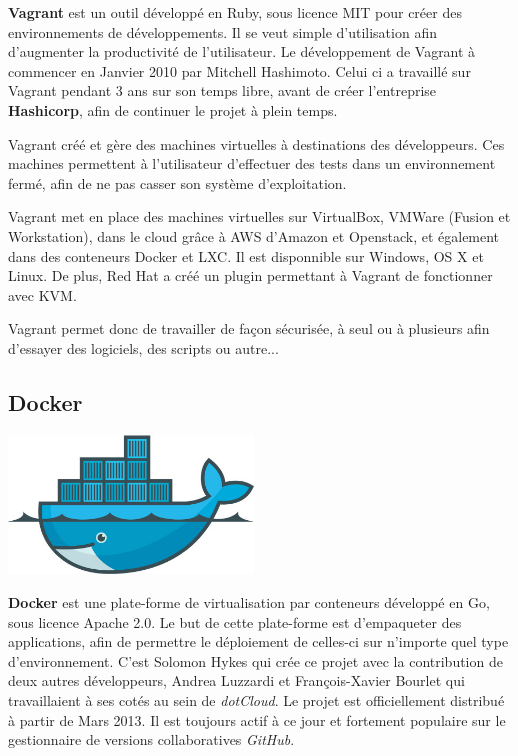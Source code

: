 \documentclass[12pt,a4paper]{article}
\begin{document}
\textbf{Vagrant} est un outil développé en Ruby, sous licence MIT pour créer des environnements de développements. Il se veut simple d'utilisation afin d'augmenter la productivité de l'utilisateur. Le développement de Vagrant à commencer en Janvier 2010 par Mitchell Hashimoto. Celui ci a travaillé sur Vagrant pendant 3 ans sur son temps libre, avant de créer l'entreprise \textbf{Hashicorp}, afin de continuer le projet à plein temps.

Vagrant créé et gère des machines virtuelles à destinations des développeurs. Ces machines permettent à l'utilisateur d'effectuer des tests dans un environnement fermé, afin de ne pas casser son système d'exploitation. 

Vagrant met en place des machines virtuelles sur VirtualBox, VMWare (Fusion et Workstation), dans le cloud grâce à AWS d'Amazon et Openstack, et également dans des conteneurs Docker et LXC. Il est disponnible sur Windows, OS X et Linux. De plus, Red Hat a créé un plugin permettant à Vagrant de fonctionner avec KVM.

Vagrant permet donc de travailler de façon sécurisée, à seul ou à plusieurs afin d'essayer des logiciels, des scripts ou autre...

\subsection{Docker}
\begin{center}
  \includegraphics[width=6.5cm]{images_rapport/docker_logo.jpg}
\end{center}

\newpage

\textbf{Docker} est une plate-forme de virtualisation par conteneurs développé en Go, sous licence Apache 2.0. Le but de cette plate-forme est d'empaqueter des applications, afin de permettre le déploiement de celles-ci sur n'importe quel type d'environnement. C'est Solomon Hykes qui crée ce projet avec la contribution de deux autres développeurs, Andrea Luzzardi et François-Xavier Bourlet qui travaillaient à ses cotés au sein de \textit{dotCloud}. Le projet est officiellement distribué à partir de Mars 2013. Il est toujours actif à ce jour et fortement populaire sur le gestionnaire de versions collaboratives \textit{GitHub}.
\end{document}
